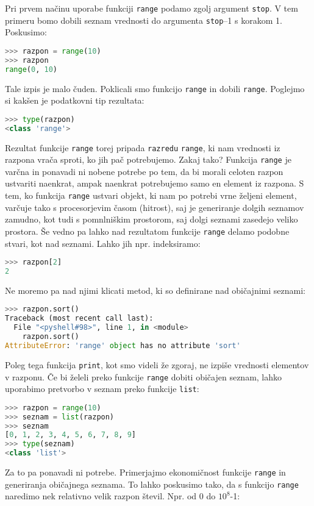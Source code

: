 Pri prvem načinu uporabe funkciji \texttt{range} podamo zgolj argument \texttt{stop}. V tem primeru bomo dobili seznam vrednosti do argumenta \texttt{stop}--1 s korakom 1. Poskusimo:
\begin{lstlisting}[language=Python, showstringspaces=false]
>>> razpon = range(10)
>>> razpon
range(0, 10)
\end{lstlisting}
Tale izpis je malo čuden. Poklicali smo funkcijo \texttt{range} in dobili \texttt{range}. Poglejmo si kakšen je podatkovni tip rezultata:
\begin{lstlisting}[language=Python, showstringspaces=false]
>>> type(razpon)
<class 'range'>
\end{lstlisting}
Rezultat funkcije \texttt{range} torej pripada \texttt{razredu} \texttt{range}, ki nam vrednosti iz razpona vrača sproti, ko jih pač potrebujemo. Zakaj tako? Funkcija \texttt{range} je varčna in ponavadi ni nobene potrebe po tem, da bi morali celoten razpon ustvariti naenkrat, ampak naenkrat potrebujemo samo en element iz razpona. S tem, ko funkcija \texttt{range} ustvari objekt, ki nam po potrebi vrne željeni element, varčuje tako s procesorjevim časom (hitrost), saj je generiranje dolgih seznamov zamudno, kot tudi s pomnlniškim prostorom, saj dolgi seznami zasedejo veliko prostora. Še vedno pa lahko nad rezultatom funkcije \texttt{range} delamo podobne stvari, kot nad seznami. Lahko jih npr. indeksiramo:
\begin{lstlisting}[language=Python, showstringspaces=false]
>>> razpon[2]
2
\end{lstlisting}
Ne moremo pa nad njimi klicati metod, ki so definirane nad običajnimi seznami:
\begin{lstlisting}[language=Python, showstringspaces=false]
>>> razpon.sort()
Traceback (most recent call last):
  File "<pyshell#98>", line 1, in <module>
    razpon.sort()
AttributeError: 'range' object has no attribute 'sort'
\end{lstlisting}
Poleg tega funkcija \texttt{print}, kot smo videli že zgoraj, ne izpiše vrednosti elementov v razponu. Če bi želeli preko funkcije \texttt{range} dobiti običajen seznam, lahko uporabimo pretvorbo v seznam preko funkcije \texttt{list}:
\begin{lstlisting}[language=Python, showstringspaces=false]
>>> razpon = range(10)
>>> seznam = list(razpon)
>>> seznam
[0, 1, 2, 3, 4, 5, 6, 7, 8, 9]
>>> type(seznam)
<class 'list'>
\end{lstlisting}
Za to pa ponavadi ni potrebe. Primerjajmo ekonomičnost funkcije \texttt{range} in generiranja običajnega seznama. To lahko poskusimo tako, da s funkcijo \texttt{range} naredimo nek relativno velik razpon števil. Npr. od 0 do $10^8$-1:
